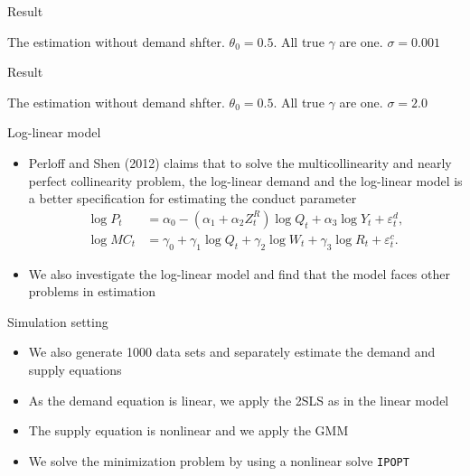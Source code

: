 \documentclass[aspectratio = 169]{beamer}
\theoremstyle{definition}
\begin{document}
\begin{frame}{Result}
    \begin{table}[]
        \centering
        \tiny
        \caption{The estimation without demand shfter. $\theta_0 = 0.5$. All true $\gamma$ are one. $\sigma = 0.001$}
        \label{tab:linear_without_demand}
    \end{table}
\end{frame}



\begin{frame}{Result}
    \begin{table}[]
        \centering
        \tiny
        \caption{The estimation without demand shfter. $\theta_0 = 0.5$. All true $\gamma$ are one. $\sigma = 2.0$}
        \label{tab:linear_without_demand}
    \end{table}
\end{frame}




\begin{frame}{Log-linear model}
    \begin{itemize}
        \item Perloff and Shen (2012) claims that to solve the multicollinearity and nearly perfect collinearity problem, the log-linear demand and the log-linear model is a better specification for estimating the conduct parameter
        \begin{align}
            \log P_{t} &= \alpha_0 - (\alpha_1 + \alpha_2 Z^{R}_{t}) \log Q_t + \alpha_3 \log Y_t + \varepsilon^{d}_{t},\label{eq:log_linear_demand}\\
            \log MC_t &= \gamma_0 + \gamma_1 \log Q_t +  \gamma_2 \log W_{t} + \gamma_3 \log R_t + \varepsilon^{c}_{t}.\label{eq:log_linear_marginal_cost}
        \end{align}
        \item We also investigate the log-linear model and find that the model faces other problems in estimation
    \end{itemize}
\end{frame}

\begin{frame}{Simulation setting}
    \begin{itemize}
        \item We also generate 1000 data sets and separately estimate the demand and supply equations
        \item As the demand equation is linear, we apply the 2SLS as in the linear model
        \item The supply equation is nonlinear and we apply the GMM
        \item We solve the minimization problem by using a nonlinear solve \texttt{IPOPT}
    \end{itemize}
\end{frame}
\end{document}
